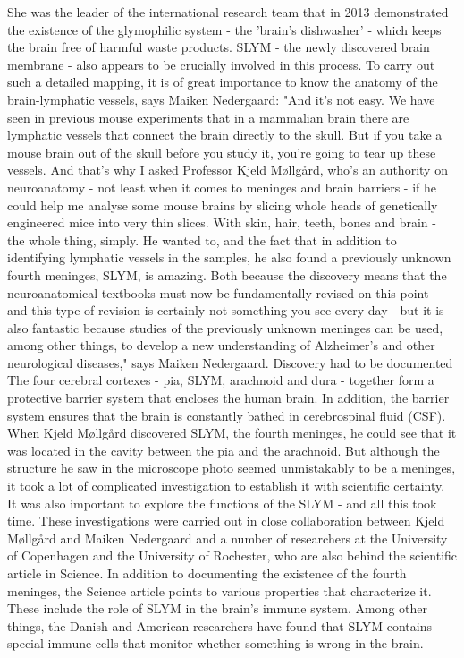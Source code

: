 She was the leader of the international research team that in 2013 demonstrated the existence of the glymophilic system - the 'brain's dishwasher' - which keeps the brain free of harmful waste products. SLYM - the newly discovered brain membrane - also appears to be crucially involved in this process.
To carry out such a detailed mapping, it is of great importance to know the anatomy of the brain-lymphatic vessels, says Maiken Nedergaard:
"And it's not easy. We have seen in previous mouse experiments that in a mammalian brain there are lymphatic vessels that connect the brain directly to the skull. But if you take a mouse brain out of the skull before you study it, you're going to tear up these vessels. And that's why I asked Professor Kjeld Møllgård, who's an authority on neuroanatomy - not least when it comes to meninges and brain barriers - if he could help me analyse some mouse brains by slicing whole heads of genetically engineered mice into very thin slices. With skin, hair, teeth, bones and brain - the whole thing, simply.
He wanted to, and the fact that in addition to identifying lymphatic vessels in the samples, he also found a previously unknown fourth meninges, SLYM, is amazing. Both because the discovery means that the neuroanatomical textbooks must now be fundamentally revised on this point - and this type of revision is certainly not something you see every day - but it is also fantastic because studies of the previously unknown meninges can be used, among other things, to develop a new understanding of Alzheimer's and other neurological diseases," says Maiken Nedergaard.
Discovery had to be documented
The four cerebral cortexes - pia, SLYM, arachnoid and dura - together form a protective barrier system that encloses the human brain. In addition, the barrier system ensures that the brain is constantly bathed in cerebrospinal fluid (CSF).
When Kjeld Møllgård discovered SLYM, the fourth meninges, he could see that it was located in the cavity between the pia and the arachnoid. But although the structure he saw in the microscope photo seemed unmistakably to be a meninges, it took a lot of complicated investigation to establish it with scientific certainty. It was also important to explore the functions of the SLYM - and all this took time.
These investigations were carried out in close collaboration between Kjeld Møllgård and Maiken Nedergaard and a number of researchers at the University of Copenhagen and the University of Rochester, who are also behind the scientific article in Science.
In addition to documenting the existence of the fourth meninges, the Science article points to various properties that characterize it. These include the role of SLYM in the brain's immune system. Among other things, the Danish and American researchers have found that SLYM contains special immune cells that monitor whether something is wrong in the brain.
